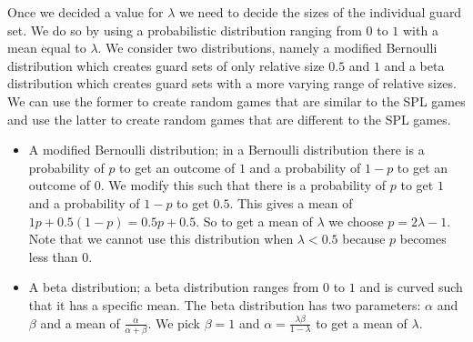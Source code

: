 Once we decided a value for $\lambda$ we need to decide the sizes of the individual guard set. We do so by using a probabilistic distribution ranging from $0$ to $1$ with a mean equal to $\lambda$. We consider two distributions, namely a modified Bernoulli distribution which creates guard sets of only relative size $0.5$ and $1$ and a beta distribution which creates guard sets with a more varying range of relative sizes. We can use the former to create random games that are similar to the SPL games and use the latter to create random games that are different to the SPL games.
\begin{itemize}
	\item A modified Bernoulli distribution; in a Bernoulli distribution there is a probability of $p$ to get an outcome of $1$ and a probability of $1-p$ to get an outcome of $0$. We modify this such that there is a probability of $p$ to get $1$ and a probability of $1-p$ to get $0.5$. This gives a mean of $1p + 0.5(1-p) = 0.5p + 0.5$. So to get a mean of $\lambda$ we choose $p = 2\lambda - 1$. Note that we cannot use this distribution when $\lambda < 0.5$ because $p$ becomes less than $0$.
	\item A beta distribution; a beta distribution ranges from $0$ to $1$ and is curved such that it has a specific mean. The beta distribution has two parameters: $\alpha$ and $\beta$ and a mean of $\frac{\alpha}{\alpha+\beta}$. We pick $\beta=1$ and $\alpha = \frac{\lambda\beta}{1-\lambda}$ to get a mean of $\lambda$.
\end{itemize}

